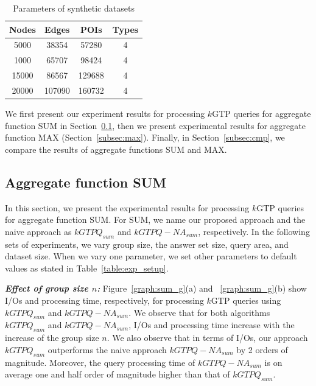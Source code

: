\vspace*{10pt}
\begin{table}[htbp]
  \centering

\begin{tabular}{|c|c|c|c|}
  \hline
  Nodes& Edges & POIs & Types\\
  \hline
  5000 & 38354 & 57280 & 4\\
  \hline
  1000 & 65707 & 98424 & 4\\
  \hline
  15000 & 86567 & 129688 & 4\\
  \hline
 20000 & 107090 & 160732 & 4 \\
  \hline
\end{tabular}
\caption{Parameters of synthetic datasets} \label{table:exp_synthetic} \vspace{-2mm}
\end{table}

\vspace*{10pt}

We first present our experiment results for processing $k$GTP queries for aggregate function SUM in Section~\ref{subsec:sum},
then we present experimental results for aggregate function MAX  (Section~\ref{subsec:max}). Finally, in Section~\ref{subsec:cmp}, we compare the results of aggregate functions SUM and MAX.


\subsection{Aggregate function SUM}
\label{subsec:sum}
In this section, we present the experimental results for processing $k$GTP queries for aggregate function SUM. For SUM, we name our proposed approach and the naive approach as $kGTPQ_{sum}$ and $kGTPQ-NA_{sum}$, respectively. In the following sets of experiments, we vary group size, the answer set size, query area, and dataset size. When we vary one parameter, we set other parameters to default values as stated in Table~\ref{table:exp_setup}.

\textbf{\emph{Effect of group size $n$: }}Figure~\ref{graph:sum_g}(a) and ~\ref{graph:sum_g}(b) show I/Os and processing time, respectively, for processing $k$GTP queries using $kGTPQ_{sum}$ and $kGTPQ-NA_{sum}$. We observe that for both algorithms $kGTPQ_{sum}$ and $kGTPQ-NA_{sum}$, I/Os and processing time increase with the increase of the group size $n$. We also observe that in terms of I/Os, our approach $kGTPQ_{sum}$ outperforms the naive approach $kGTPQ-NA_{sum}$ by 2 orders of magnitude. Moreover, the query processing time of $kGTPQ-NA_{sum}$ is on average one and half order of magnitude higher than that of $kGTPQ_{sum}$.

